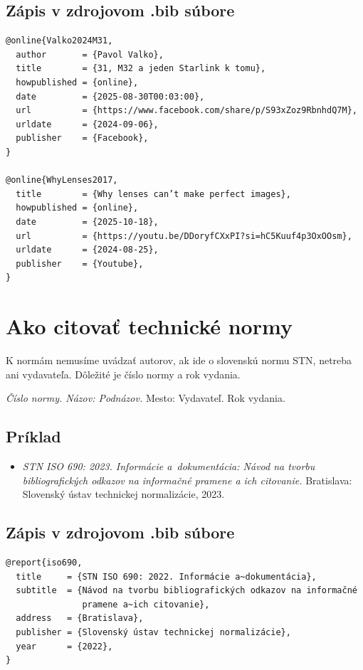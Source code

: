 \subsection*{\normalsize Zápis v zdrojovom .bib súbore}
\begin{verbatim}
@online{Valko2024M31,
  author       = {Pavol Valko},
  title        = {31, M32 a jeden Starlink k tomu},
  howpublished = {online},
  date         = {2025-08-30T00:03:00},
  url          = {https://www.facebook.com/share/p/S93xZoz9RbnhdQ7M},
  urldate      = {2024-09-06},
  publisher    = {Facebook},
}

@online{WhyLenses2017,
  title        = {Why lenses can’t make perfect images},
  howpublished = {online},
  date         = {2025-10-18},
  url          = {https://youtu.be/DDoryfCXxPI?si=hC5Kuuf4p3OxOOsm},
  urldate      = {2024-08-25},
  publisher    = {Youtube},
}
\end{verbatim}

\section{Ako citovať technické normy}
K normám nemusíme uvádzať autorov, ak ide o slovenskú normu STN, netreba ani vydavateľa. Dôležité je číslo normy a rok vydania.

\begin{trivlist}
\item \textit{Číslo normy. Názov: Podnázov.} Mesto: Vydavateľ. Rok vydania.
\end{trivlist}

\subsection*{\normalsize Príklad}
\begin{itemize}
  \item \textit{STN ISO 690: 2023. Informácie a~dokumentácia: Návod na tvorbu bibliografických odkazov na informačné pramene a ich citovanie.} Bratislava: Slovenský ústav technickej normalizácie, 2023.
\end{itemize}

\subsection*{\normalsize Zápis v zdrojovom .bib súbore}
\begin{verbatim}
@report{iso690,
  title     = {STN ISO 690: 2022. Informácie a~dokumentácia},
  subtitle  = {Návod na tvorbu bibliografických odkazov na informačné
               pramene a~ich citovanie},
  address   = {Bratislava},
  publisher = {Slovenský ústav technickej normalizácie},
  year      = {2022},
}
\end{verbatim}

